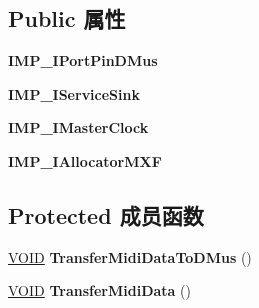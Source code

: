 \subsection*{Public 属性}
\begin{DoxyCompactItemize}
\item 
\mbox{\label{class_c_port_pin_d_mus_a8942eed2e7707b071145402dd5f7926e}} 
{\bfseries I\+M\+P\+\_\+\+I\+Port\+Pin\+D\+Mus}
\item 
\mbox{\label{class_c_port_pin_d_mus_a4c0bf968189c2809c0ca6838912a7e7b}} 
{\bfseries I\+M\+P\+\_\+\+I\+Service\+Sink}
\item 
\mbox{\label{class_c_port_pin_d_mus_a131ce49cb5ffe43d507cdbe716552f72}} 
{\bfseries I\+M\+P\+\_\+\+I\+Master\+Clock}
\item 
\mbox{\label{class_c_port_pin_d_mus_a827787401c31a9cfc24ab8442fc97ad4}} 
{\bfseries I\+M\+P\+\_\+\+I\+Allocator\+M\+XF}
\end{DoxyCompactItemize}
\subsection*{Protected 成员函数}
\begin{DoxyCompactItemize}
\item 
\mbox{\label{class_c_port_pin_d_mus_a9ac876c488473b76391f131980c4c641}} 
\hyperlink{interfacevoid}{V\+O\+ID} {\bfseries Transfer\+Midi\+Data\+To\+D\+Mus} ()
\item 
\mbox{\label{class_c_port_pin_d_mus_a48ffb3ae07af7c68b458033477c51bca}} 
\hyperlink{interfacevoid}{V\+O\+ID} {\bfseries Transfer\+Midi\+Data} ()
\end{DoxyCompactItemize}
